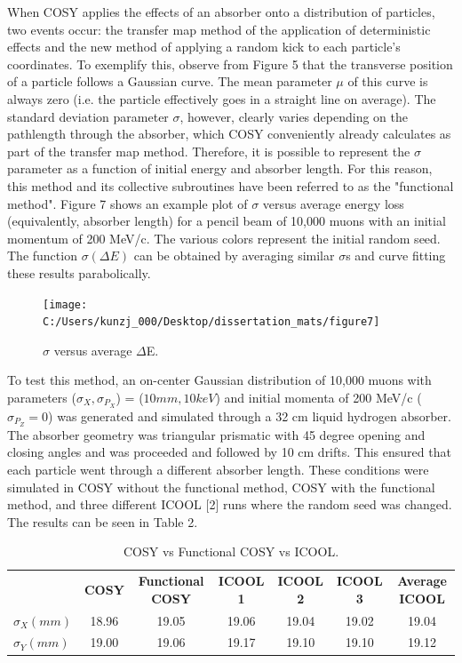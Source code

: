 \documentclass{jacow}
\begin{document}
When COSY applies the effects of an absorber onto a distribution of particles, two events occur: the transfer map method of the application of deterministic effects and the new method of applying a random kick to each particle's coordinates. To exemplify this, observe from Figure 5 that the transverse position of a particle follows a Gaussian curve. The mean parameter $\mu$ of this curve is always zero (i.e. the particle effectively goes in a straight line on average). The standard deviation parameter $\sigma$, however, clearly varies depending on the pathlength through the absorber, which COSY conveniently already calculates as part of the transfer map method. Therefore, it is possible to represent the $\sigma$ parameter as a function of initial energy and absorber length. For this reason, this method and its collective subroutines have been referred to as the "functional method". Figure 7 shows an example plot of $\sigma$ versus average energy loss (equivalently, absorber length) for a pencil beam of 10,000 muons with an initial momentum of 200 MeV/c. The various colors represent the initial random seed. The function $\sigma (\Delta E)$ can be obtained by averaging similar $\sigma$s and curve fitting these results parabolically. \par

\begin{figure}[h!]
\centering
\texttt{[image: C:/Users/kunzj\_000/Desktop/dissertation\_mats/figure7]}
\caption{$\sigma$ versus average $\Delta$E.}
\end{figure}

To test this method, an on-center Gaussian distribution of 10,000 muons with parameters ($\sigma_X, \sigma_{P_X}$) = ($10 mm, 10 keV$) and initial momenta of 200 MeV/c ($\sigma_{P_Z} = 0$) was generated and simulated through a 32 cm liquid hydrogen absorber. The absorber geometry was triangular prismatic with 45 degree opening and closing angles and was proceeded and followed by 10 cm drifts. This ensured that each particle went through a different absorber length. These conditions were simulated in COSY without the functional method, COSY with the functional method, and three different ICOOL [2] runs where the random seed was changed. The results can be seen in Table 2.

\begin{table}[hbt]
   \centering
   \caption{COSY vs Functional COSY vs ICOOL.}
   \begin{tabular}{lcccccc}
       \toprule
	\textbf{}& \textbf{COSY} & \textbf{Functional COSY}&\textbf{ICOOL 1}&\textbf{ICOOL 2}&\textbf{ICOOL 3}& \textbf{Average ICOOL} \\ 
          $ \sigma_X (mm)$&18.96&19.05&19.06&19.04&19.02&19.04\\
	$\sigma_Y (mm)$&19.00&19.06&19.17&19.10&19.10&19.12\\
	\bottomrule
   \end{tabular}
   \label{l2ea4-t1}
\end{table}
\end{document}
